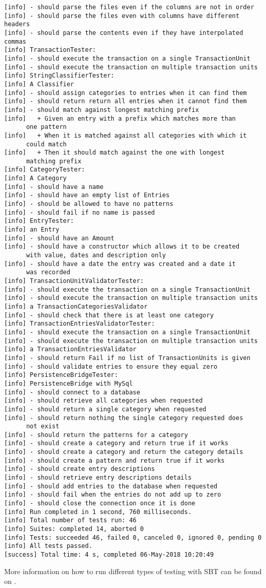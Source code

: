 \begin{lstlisting}
[info] - should parse the files even if the columns are not in order
[info] - should parse the files even with columns have different headers
[info] - should parse the contents even if they have interpolated commas
[info] TransactionTester:
[info] - should execute the transaction on a single TransactionUnit
[info] - should execute the transaction on multiple transaction units
[info] StringClassifierTester:
[info] A Classifier
[info] - should assign categories to entries when it can find them
[info] - should return return all entries when it cannot find them
[info] - should match against longest matching prefix
[info]   + Given an entry with a prefix which matches more than 
      one pattern 
[info]   + When it is matched against all categories with which it
      could match 
[info]   + Then it should match against the one with longest 
      matching prefix 
[info] CategoryTester:
[info] A Category
[info] - should have a name
[info] - should have an empty list of Entries
[info] - should be allowed to have no patterns
[info] - should fail if no name is passed
[info] EntryTester:
[info] an Entry
[info] - should have an Amount
[info] - should have a constructor which allows it to be created
      with value, dates and description only
[info] - should have a date the entry was created and a date it
      was recorded
[info] TransactionUnitValidatorTester:
[info] - should execute the transaction on a single TransactionUnit
[info] - should execute the transaction on multiple transaction units
[info] a TransactionCategoriesValidator
[info] - should check that there is at least one category
[info] TransactionEntriesValidatorTester:
[info] - should execute the transaction on a single TransactionUnit
[info] - should execute the transaction on multiple transaction units
[info] a TransactionEntriesValidator
[info] - should return Fail if no list of TransactionUnits is given
[info] - should validate entries to ensure they equal zero
[info] PersistenceBridgeTester:
[info] PersistenceBridge with MySql
[info] - should connect to a database
[info] - should retrieve all categories when requested
[info] - should return a single category when requested
[info] - should return nothing the single category requested does
      not exist
[info] - should return the patterns for a category
[info] - should create a category and return true if it works
[info] - should create a category and return the category details
[info] - should create a pattern and return true if it works
[info] - should create entry descriptions
[info] - should retrieve entry descriptions details
[info] - should add entries to the database when requested
[info] - should fail when the entries do not add up to zero
[info] - should close the connection once it is done
[info] Run completed in 1 second, 760 milliseconds.
[info] Total number of tests run: 46
[info] Suites: completed 14, aborted 0
[info] Tests: succeeded 46, failed 0, canceled 0, ignored 0, pending 0
[info] All tests passed.
[success] Total time: 4 s, completed 06-May-2018 10:20:49
\end{lstlisting}

More information on how to run different types of testing with SBT can be found
on \cite[][Ch.~2]{hinojosa2013testing}.
